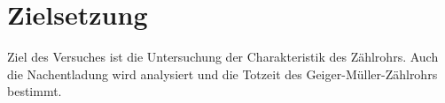 \section{Zielsetzung}
\label{sec:Zielsetzung}
Ziel des Versuches ist die Untersuchung der Charakteristik des Zählrohrs.
Auch die Nachentladung wird analysiert und die Totzeit des Geiger-Müller-Zählrohrs bestimmt.